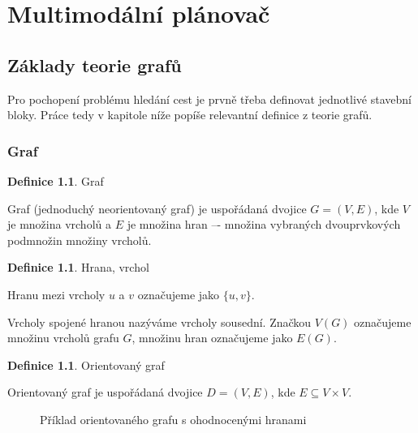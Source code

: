\documentclass[thesis=M,czech]{FITthesis}[2019/12/23]
\theoremstyle{plain}
\theoremstyle{definition}
\newtheorem{defn}[thm]{Definice} %
\begin{document}
\chapter{Multimodální plánovač}
\section{Základy teorie grafů}

Pro pochopení problému hledání cest je prvně třeba definovat jednotlivé stavební bloky. Práce tedy v kapitole níže popíše relevantní definice z teorie grafů.

\subsection{Graf}

\begin{defn}{Graf}\label{thm:graf}
	
Graf (jednoduchý neorientovaný graf) je uspořádaná dvojice $G = (V,E)$, kde $V$ je množina vrcholů a $E$ je množina hran –- množina vybraných dvouprvkových podmnožin množiny vrcholů. \cite{zaklady-teorie-grafu}

\end{defn}

\begin{defn}{Hrana, vrchol}\label{thm:graf}

Hranu mezi vrcholy $u$ a $v$ označujeme jako $\{u, v\}$. 

Vrcholy spojené hranou nazýváme vrcholy sousední. Značkou $V(G)$ označujeme množinu vrcholů grafu $G$, množinu hran označujeme jako $E(G)$. \cite{zaklady-teorie-grafu}

\end{defn}

\begin{defn}{Orientovaný graf}\label{thm:graf}

Orientovaný graf je uspořádaná dvojice $D = (V, E)$, kde $E \subseteq V \times V$. \cite{zaklady-teorie-grafu}

\end{defn}

\begin{figure}[H]\centering
	

	\caption[Příklad orientovaného grafu s ohodnocenými hranami]{Příklad orientovaného grafu s ohodnocenými hranami}\label{fig:float}
\end{figure}
\end{document}
